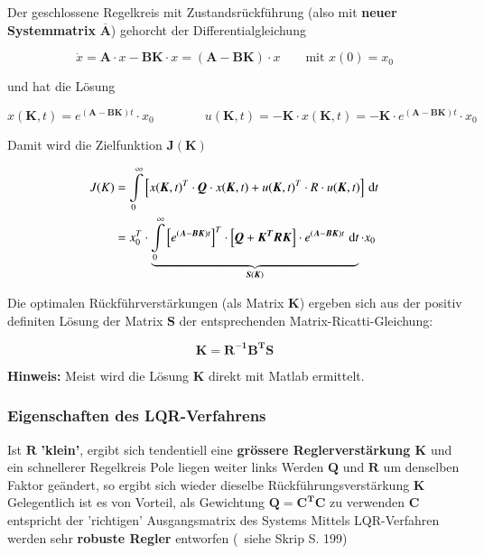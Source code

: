 Der geschlossene Regelkreis mit Zustandsrückführung (also mit \textbf{neuer Systemmatrix} $\overline{\bm{A}}$) gehorcht der Differentialgleichung 

\vspace{-0.2cm}

$$ \dot{x} = \bm{A} \cdot x - \bm{BK} \cdot x = (\bm{A} - \bm{BK}) \cdot x \qquad \text{mit } x(0) = x_0 $$


und hat die Lösung

\vspace{-0.2cm}

$$ x(\bm{K}, t) = e^{(\bm{A} - \bm{BK}) t} \cdot x_0 \qquad \qquad
    u(\bm{K}, t) = - \bm{K} \cdot x(\bm{K}, t) = - \bm{K} \cdot e^{(\bm{A} - \bm{BK}) t} \cdot x_0 $$


\vspace{0.2cm}

Damit wird die Zielfunktion $\bm{J(K)}$ 

\vspace{-0.4cm}

\begin{align*}
    J(K)    &= \int\limits_{0}^{\infty} \left[ x(\bm{K}, t)^T \cdot\bm{Q} \cdot x(\bm{K}, t) + u(\bm{K}, t)^T \cdot R \cdot u(\bm{K}, t) \right] \, \mathop{} \! \mathrm{d} t \\
            &= x_0^T \cdot \underbrace{ \int\limits_{0}^{\infty} \left[ e^{(\bm{A} - \bm{BK}) t} \right]^T \cdot \left[ \bm{Q} + \bm{K^T RK} \right] \cdot e^{(\bm{A} - \bm{BK}) t} \, \mathop{} \! \mathrm{d} t }_{\bm{S}(\bm{K})} \cdot x_0
\end{align*}


Die optimalen Rückführverstärkungen (als Matrix $\bm{K}$) ergeben sich aus der positiv definiten Lösung der Matrix $\bm{S}$ der entsprechenden Matrix-Ricatti-Gleichung:

\vspace{-0.2cm}

$$ \boxed{ \bm{K} = \bm{R^{-1} B^T S} } $$

\textbf{Hinweis:} Meist wird die Lösung $\bm{K}$ direkt mit Matlab ermittelt.


\subsubsection{Eigenschaften des LQR-Verfahrens}

\begin{outline}
    \1 Ist $\bm{R}$ \textbf{'klein'}, ergibt sich tendentiell eine \textbf{grössere Reglerverstärkung $\bm{K}$} und ein schnellerer Regelkreis
        \2 Pole liegen weiter links
    \1 Werden $\bm{Q}$ und $\bm{R}$ um denselben Faktor geändert, so ergibt sich wieder dieselbe Rückführungsverstärkung $\bm{K}$
    \1 Gelegentlich ist es von Vorteil, als Gewichtung $\bm{Q} = \bm{C^T C}$ zu verwenden
        \2 $\bm{C}$ entspricht der 'richtigen' Ausgangsmatrix des Systems
    \1 Mittels LQR-Verfahren werden sehr \textbf{robuste Regler} entworfen (\textrightarrow\ siehe Skrip S. 199)
\end{outline}


